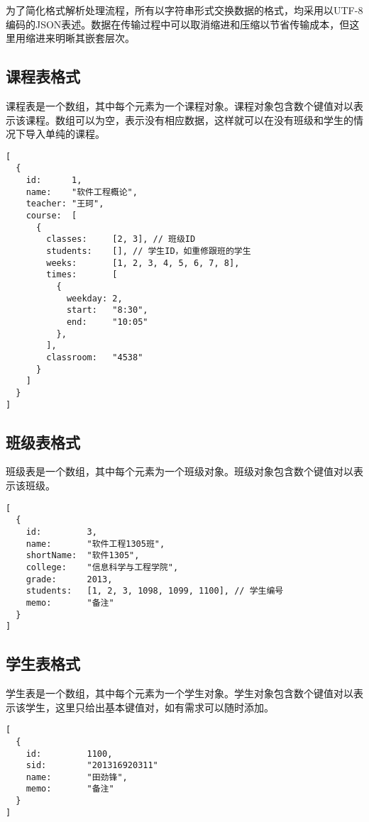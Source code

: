 \documentclass[cs4size,a4paper,nofonts]{ctexart}
\begin{document}
为了简化格式解析处理流程，所有以字符串形式交换数据的格式，均采用以UTF-8编码的JSON表述。数据在传输过程中可以取消缩进和压缩以节省传输成本，但这里用缩进来明晰其嵌套层次。

\subsection{课程表格式}\label{sec:课程表格式}

课程表是一个数组，其中每个元素为一个课程对象。课程对象包含数个键值对以表示该课程。数组可以为空，表示没有相应数据，这样就可以在没有班级和学生的情况下导入单纯的课程。

\begin{Verbatim}
[
  {
    id:      1,
    name:    "软件工程概论",
    teacher: "王珂",
    course:  [
      {
        classes:     [2, 3], // 班级ID
        students:    [], // 学生ID，如重修跟班的学生
        weeks:       [1, 2, 3, 4, 5, 6, 7, 8],
        times:       [
          {
            weekday: 2,
            start:   "8:30",
            end:     "10:05"
          },
        ],
        classroom:   "4538"
      }
    ]
  }
]
\end{Verbatim}


\subsection{班级表格式}\label{sec:班级表格式}

班级表是一个数组，其中每个元素为一个班级对象。班级对象包含数个键值对以表示该班级。

\begin{Verbatim}
[
  {
    id:         3,
    name:       "软件工程1305班",
    shortName:  "软件1305",
    college:    "信息科学与工程学院",
    grade:      2013,
    students:   [1, 2, 3, 1098, 1099, 1100], // 学生编号
    memo:       "备注"
  }
]
\end{Verbatim}

\subsection{学生表格式}\label{sec:学生表格式}

学生表是一个数组，其中每个元素为一个学生对象。学生对象包含数个键值对以表示该学生，这里只给出基本键值对，如有需求可以随时添加。

\begin{Verbatim}
[
  {
    id:         1100,
    sid:        "201316920311"
    name:       "田劲锋",
    memo:       "备注"
  }
]
\end{Verbatim}
\end{document}
